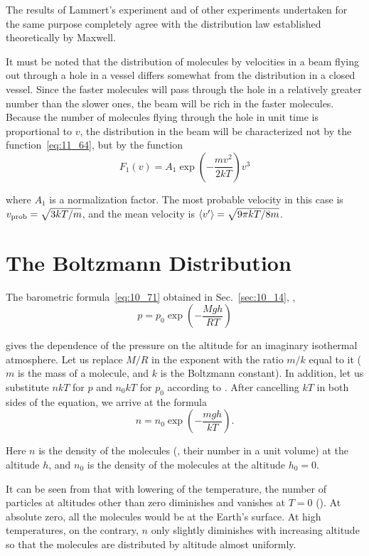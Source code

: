 The results of Lammert's experiment and of other experiments undertaken for the same purpose completely agree with the distribution law established theoretically by Maxwell.

It must be noted that the distribution of molecules by velocities in a beam flying out through a hole in a vessel differs somewhat from the distribution in a closed vessel. Since the faster molecules will pass through the hole in a relatively greater number than the slower ones, the beam will be rich in the faster molecules. Because the number of molecules flying through the hole in unit time is proportional to $v$, the distribution in the beam will be characterized not by the function~\eqref{eq:11_64}, but by the function
\begin{equation*}
	F_1(v) = A_1 \exp\left(-\frac{mv^2}{2kT}\right) v^3
\end{equation*}

\noindent
where $A_1$ is a normalization factor. The most probable velocity in this case is $v_{\text{prob}}=\sqrt{3kT/m}$, and the mean velocity is $\left\langle v' \right\rangle=\sqrt{9\pi kT/8m}$.

\section{The Boltzmann Distribution}\label{sec:11_8}

The barometric formula~\eqref{eq:10_71} obtained in Sec.~\ref{sec:10_14}, \ie,
\begin{equation*}
	p = p_0 \exp\left(-\frac{Mgh}{RT}\right)
\end{equation*}

\noindent
gives the dependence of the pressure on the altitude for an imaginary isothermal atmosphere. Let us replace $M/R$ in the exponent with the ratio $m/k$ equal to it ($m$ is the mass of a molecule, and $k$ is the Boltzmann constant). In addition, let us substitute $nkT$ for $p$ and $n_0kT$ for $p_0$ according to . After cancelling $kT$ in both sides of the equation, we arrive at the formula
\begin{equation}\label{eq:11_75}
	n = n_0 \exp\left(-\frac{mgh}{kT}\right).
\end{equation}

\noindent
Here $n$ is the density of the molecules (\ie, their number in a unit volume) at the altitude $h$, and $n_0$ is the density of the molecules at the altitude $h_0=0$.

It can be seen from  that with lowering of the temperature, the number of particles at altitudes other than zero diminishes and vanishes at $T=0$ (). At absolute zero, all the molecules would be at the Earth's surface. At high temperatures, on the contrary, $n$ only slightly diminishes with increasing altitude so that the molecules are distributed by altitude almost uniformly.

